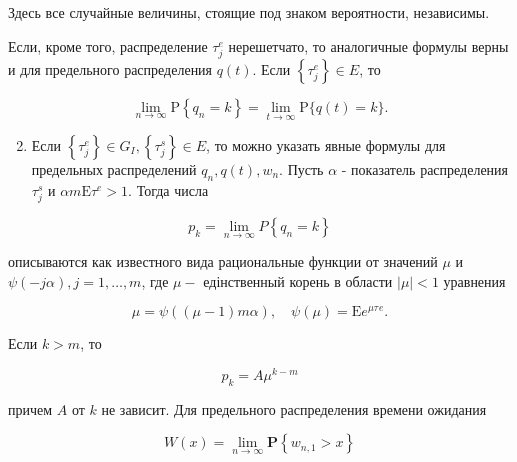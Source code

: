 \documentclass[10pt]{article}
\begin{document}
Здесь все случайные величины, стоящие под знаком вероятности, независимы.



Если, кроме того, распределение $\tau_{j}^{e}$ нерешетчато, то аналогичные формулы верны и для предельного распределения $q(t)$. Если $\left\{\tau_{j}^{e}\right\} \in E$, то



\[

\lim _{n \rightarrow \infty} \mathrm{P}\left\{q_{n}=k\right\}=\lim _{t \rightarrow \infty} \mathrm{P}\{q(t)=k\} .

\]



\begin{enumerate}

  \setcounter{enumi}{1}

  \item Если $\left\{\tau_{j}^{e}\right\} \in G_{I},\left\{\tau_{j}^{s}\right\} \in E$, то можно указать явные формулы для предельных распределений $q_{n}, q(t), w_{n}$. Пусть $\alpha$ - показатель распределения $\tau_{j}^{s}$ и $\alpha m \mathrm{E} \tau^{e}>1$. Тогда числа

\end{enumerate}



\[

p_{k}=\lim _{n \rightarrow \infty} P\left\{q_{n}=k\right\}

\]



описываются как известного вида рациональные функции от значений $\mu$ и $\psi(-j \alpha), j=1, \ldots, m$, где $\mu-$ едінственный корень в области $|\mu|<1$ уравнения



\[

\mu=\psi((\mu-1) m \alpha), \quad \psi(\mu)=\mathrm{E} e^{\mu \tau}{ }^{e} .

\]



Если $k>m$, то



\[

p_{k}=A \mu^{k-m}

\]



причем $A$ от $k$ не зависит. Для предельного распределения времени ожидания



\[

W(x)=\lim _{n \rightarrow \infty} \mathbf{P}\left\{w_{n, 1}>x\right\}

\]
\end{document}
